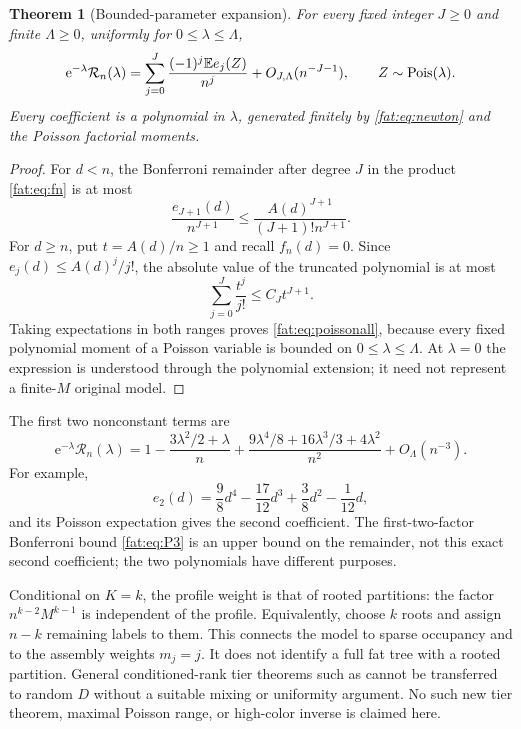 \documentclass[11pt,letterpaper]{article}
\numberwithin{equation}{section}
\newtheorem{theorem}{Theorem}[section]
\theoremstyle{remark}\newtheorem{remark}[theorem]{Remark}
\newcommand{\E}{\mathbb E}\newcommand{\Prob}{\mathbb P}\newcommand{\ee}{\mathrm e}
\begin{document}
\begin{theorem}[Bounded-parameter expansion]\label{fat:thm:poissonall}
For every fixed integer $J\ge0$ and finite $\Lambda\ge0$, uniformly for $0\le\lambda\le\Lambda$,
\begin{equation}\label{fat:eq:poissonall}
 \ee^{-\lambda}\mathcal R_n(\lambda)
 =\sum_{j=0}^{J}\frac{(-1)^j\E e_j(Z)}{n^j}
 +O_{J,\Lambda}(n^{-J-1}),\qquad Z\sim\Pois(\lambda).
\end{equation}
Every coefficient is a polynomial in $\lambda$, generated finitely by \eqref{fat:eq:newton} and the Poisson factorial moments.
\end{theorem}
\begin{proof}
For $d<n$, the Bonferroni remainder after degree $J$ in the product \eqref{fat:eq:fn} is at most
\[
 \frac{e_{J+1}(d)}{n^{J+1}}
 \le\frac{A(d)^{J+1}}{(J+1)!n^{J+1}}.
\]
For $d\ge n$, put $t=A(d)/n\ge1$ and recall $f_n(d)=0$. Since $e_j(d)\le A(d)^j/j!$, the absolute value of the truncated polynomial is at most
\[
 \sum_{j=0}^J\frac{t^j}{j!}\le C_Jt^{J+1}.
\]
Taking expectations in both ranges proves \eqref{fat:eq:poissonall}, because every fixed polynomial moment of a Poisson variable is bounded on $0\le\lambda\le\Lambda$. At $\lambda=0$ the expression is understood through the polynomial extension; it need not represent a finite-$M$ original model.
\end{proof}

The first two nonconstant terms are
\begin{equation}\label{fat:eq:P6}
 \ee^{-\lambda}\mathcal R_n(\lambda)
 =1-\frac{3\lambda^2/2+\lambda}{n}
 +\frac{9\lambda^4/8+16\lambda^3/3+4\lambda^2}{n^2}
 +O_\Lambda(n^{-3}).
\end{equation}
For example,
\[
 e_2(d)=\frac98d^4-\frac{17}{12}d^3+\frac38d^2-\frac1{12}d,
\]
and its Poisson expectation gives the second coefficient. The first-two-factor Bonferroni bound \eqref{fat:eq:P3} is an upper bound on the remainder, not this exact second coefficient; the two polynomials have different purposes.

Conditional on $K=k$, the profile weight is that of rooted partitions: the factor $n^{k-2}M^{k-1}$ is independent of the profile. Equivalently, choose $k$ roots and assign $n-k$ remaining labels to them. This connects the model to sparse occupancy and to the assembly weights $m_j=j$. It does not identify a full fat tree with a rooted partition. General conditioned-rank tier theorems such as \cite{arratia} cannot be transferred to random $D$ without a suitable mixing or uniformity argument. No such new tier theorem, maximal Poisson range, or high-color inverse is claimed here.
\end{document}
